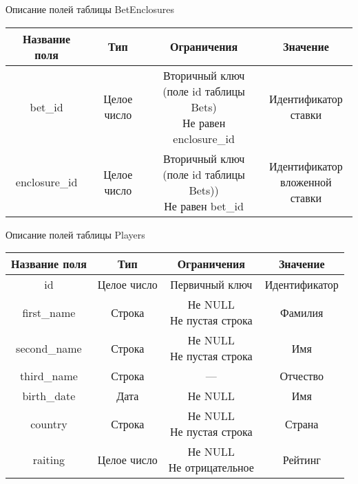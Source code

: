 \begin{center}
	\begin{threeparttable}
		\captionsetup{justification=raggedright,singlelinecheck=off}
		\caption{\label{betenclosures_table}Описание полей таблицы BetEnclosures}
		\centering
		\begin{tabular}{|c|c|c|c|}
			\hline
			Название поля & Тип & Ограничения & Значение \\
			\hline
			bet\_id & Целое число & \specialcell{Вторичный ключ\\(поле id таблицы Bets)\\Не равен enclosure\_id} & \specialcell{Идентификатор\\ставки} \\
			\hline
			enclosure\_id & Целое число & \specialcell{Вторичный ключ\\(поле id таблицы Bets))\\Не равен bet\_id} & \specialcell{Идентификатор\\вложенной ставки} \\
			\hline
		\end{tabular}
	\end{threeparttable}
\end{center}
\begin{center}
	\begin{threeparttable}
		\captionsetup{justification=raggedright,singlelinecheck=off}
		\caption{\label{players_table}Описание полей таблицы Players}
		\centering
		\begin{tabular}{|c|c|c|c|}
			\hline
			Название поля & Тип & Ограничения & Значение \\
			\hline
			id & Целое число & Первичный ключ & Идентификатор \\
			\hline
			first\_name & Строка & \specialcell{Не NULL\\Не пустая строка} & Фамилия \\
			\hline
			second\_name & Строка & \specialcell{Не NULL\\Не пустая строка} & Имя \\
			\hline
			third\_name & Строка & --- & Отчество \\
			\hline
			birth\_date & Дата & Не NULL & Имя \\
			\hline
			country & Строка & \specialcell{Не NULL\\Не пустая строка} & Страна \\
			\hline
			raiting & Целое число & \specialcell{Не NULL\\Не отрицательное} & Рейтинг\\
			\hline
		\end{tabular}
	\end{threeparttable}
\end{center}
